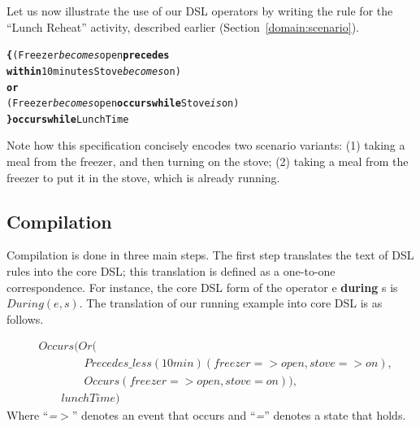 
Let us now illustrate the use of our DSL operators by writing the rule for the ``Lunch Reheat'' activity, described earlier (Section~\ref{domain:scenario}). 

\footnotesize
\begin{alltt}
{\bf \{} ( Freezer {\itshape becomes} open {\bf precedes} 
    {\bf within} 10 minutes Stove {\itshape becomes} on )
  {\bf or}
  ( Freezer {\itshape becomes} open {\bf occurs while} Stove{\itshape is} on )
{\bf \} occurs while} LunchTime
\end{alltt}
\normalsize

Note how this specification concisely encodes two scenario variants: (1) taking a meal from the freezer, and then turning on the stove;
(2) taking a meal from the freezer to put it in the stove, which is already running.

\subsection{Compilation}\label{dsl:compilation}
Compilation is done in three main steps. The first step translates the text of DSL rules into the core DSL; this translation is defined as a one-to-one correspondence. 
For instance, the core DSL form of the operator {\ttfamily e {\bf during} s} is $During(e,s)$. The translation of our running example into core DSL is as follows.

\mathleft
\footnotesize
\begin{equation*}
  \begin{split}
&Occurs(Or(\\
&\quad\quad\quad\quad Precedes\_less(10min)(freezer => open, stove => on), \\
&\quad\quad\quad\quad Occurs(freezer => open, stove = on)), \\
&\quad\quad lunchTime)
  \end{split}
\end{equation*}
\normalsize
\noindent
Where ``{\em =$>$}'' denotes an event that occurs and ``{\em =}'' denotes a state that holds.

